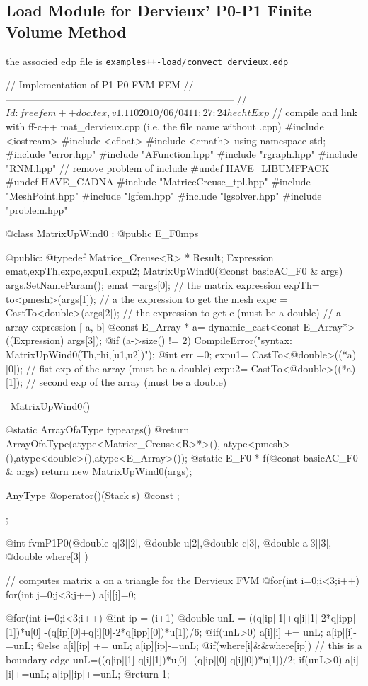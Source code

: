 \documentclass[a4paper,twoside,12pt]{book}
\begin{document}
\subsection{Load Module for Dervieux' P0-P1 Finite Volume Method}
the associed edp file is  \texttt{examples++-load/convect\_dervieux.edp}

\bFF
//  Implementation of P1-P0 FVM-FEM
// ---------------------------------------------------------------------
// $Id: freefem++doc.tex,v 1.110 2010/06/04 11:27:24 hecht Exp $
// compile and link with ff-c++  mat\_dervieux.cpp  (i.e. the file name without .cpp)
#include  <iostream>
#include  <cfloat>
#include  <cmath>
using namespace std;
#include "error.hpp"
#include "AFunction.hpp"
#include "rgraph.hpp"
#include "RNM.hpp"
// remove problem of include
#undef  HAVE_LIBUMFPACK
#undef HAVE_CADNA
#include "MatriceCreuse_tpl.hpp"
#include "MeshPoint.hpp"
#include "lgfem.hpp"
#include "lgsolver.hpp"
#include "problem.hpp"


@class MatrixUpWind0 :  @public E_F0mps { @public:
  @typedef Matrice_Creuse<R> * Result;
  Expression emat,expTh,expc,expu1,expu2;
  MatrixUpWind0(@const basicAC_F0 & args)
  {
    args.SetNameParam();
    emat =args[0]; // the matrix expression
    expTh= to<pmesh>(args[1]);  // a the expression to get the mesh
    expc = CastTo<double>(args[2]); // the expression to get c  (must be a double)
    //  a array expression [ a, b]
    @const E_Array * a= dynamic_cast<const E_Array*>((Expression) args[3]);
    @if (a->size() != 2) CompileError("syntax:  MatrixUpWind0(Th,rhi,[u1,u2])");
    @int err =0;
    expu1= CastTo<@double>((*a)[0]); // fist exp of the array (must be a  double)
    expu2= CastTo<@double>((*a)[1]); // second exp of the array (must be a  double)
  }
  
  ~MatrixUpWind0(){
  }

  @static ArrayOfaType  typeargs()
  { @return  ArrayOfaType(atype<Matrice_Creuse<R>*>(),
    atype<pmesh>(),atype<double>(),atype<E_Array>());}
  @static  E_F0 * f(@const basicAC_F0 & args){ return new MatrixUpWind0(args);}
  
  AnyType @operator()(Stack s) @const ;

};

@int   fvmP1P0(@double q[3][2], @double u[2],@double c[3], @double a[3][3], @double where[3] )
{                               // computes matrix a on a triangle for the Dervieux FVM
  @for(int i=0;i<3;i++) for(int j=0;j<3;j++) a[i][j]=0;

    @for(int i=0;i<3;i++){
        @int ip = (i+1)%
        @double unL =-((q[ip][1]+q[i][1]-2*q[ipp][1])*u[0]
                -(q[ip][0]+q[i][0]-2*q[ipp][0])*u[1])/6;
        @if(unL>0) { a[i][i] += unL; a[ip][i]-=unL;}
            @else{ a[i][ip] += unL; a[ip][ip]-=unL;}
        @if(where[i]&&where[ip]){        // this is a boundary edge
            unL=((q[ip][1]-q[i][1])*u[0] -(q[ip][0]-q[i][0])*u[1])/2;
            if(unL>0) { a[i][i]+=unL; a[ip][ip]+=unL;}
        }
    }
  @return 1;
}
\end{document}
